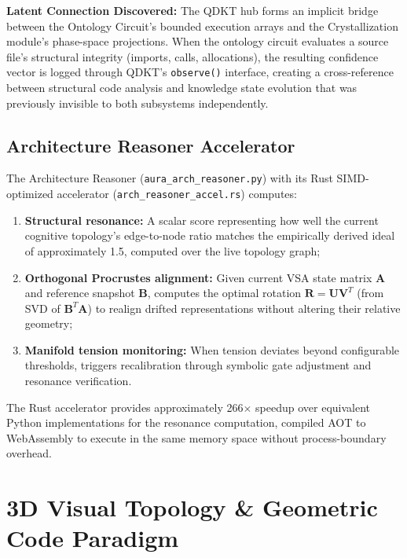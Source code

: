 \documentclass[11pt]{article}
\begin{document}
\textbf{Latent Connection Discovered:} The QDKT hub forms an implicit bridge between the Ontology Circuit's bounded execution arrays and the Crystallization module's phase-space projections. When the ontology circuit evaluates a source file's structural integrity (imports, calls, allocations), the resulting confidence vector is logged through QDKT's \texttt{observe()} interface, creating a cross-reference between structural code analysis and knowledge state evolution that was previously invisible to both subsystems independently.

\subsection{Architecture Reasoner Accelerator}

The Architecture Reasoner (\texttt{aura\_arch\_reasoner.py}) with its Rust SIMD-optimized accelerator (\texttt{arch\_reasoner\_accel.rs}) computes:

\begin{enumerate}[label=(\roman*)]
    \item \textbf{Structural resonance:} A scalar score representing how well the current cognitive topology's edge-to-node ratio matches the empirically derived ideal of approximately 1.5, computed over the live topology graph;
    \item \textbf{Orthogonal Procrustes alignment:} Given current VSA state matrix $\mathbf{A}$ and reference snapshot $\mathbf{B}$, computes the optimal rotation $\mathbf{R} = \mathbf{U}\mathbf{V}^T$ (from SVD of $\mathbf{B}^T\mathbf{A}$) to realign drifted representations without altering their relative geometry;
    \item \textbf{Manifold tension monitoring:} When tension deviates beyond configurable thresholds, triggers recalibration through symbolic gate adjustment and resonance verification.
\end{enumerate}

The Rust accelerator provides approximately 266$\times$ speedup over equivalent Python implementations for the resonance computation, compiled AOT to WebAssembly to execute in the same memory space without process-boundary overhead.

\section{3D Visual Topology \& Geometric Code Paradigm}\label{sec:visual}
\end{document}
